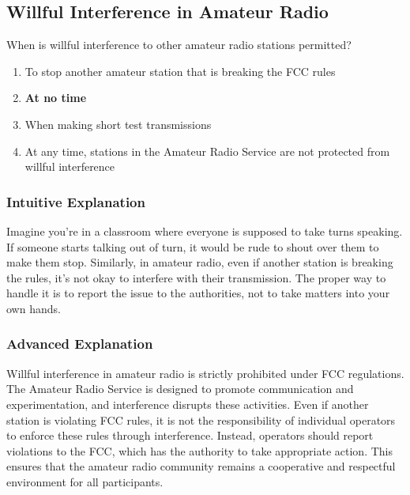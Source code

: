 \subsection{Willful Interference in Amateur Radio}
\label{T1A11}

\begin{tcolorbox}[colback=gray!10!white,colframe=black!75!black,title=T1A11]
When is willful interference to other amateur radio stations permitted?
\begin{enumerate}[label=\Alph*),noitemsep]
    \item To stop another amateur station that is breaking the FCC rules
    \item \textbf{At no time}
    \item When making short test transmissions
    \item At any time, stations in the Amateur Radio Service are not protected from willful interference
\end{enumerate}
\end{tcolorbox}

\subsubsection*{Intuitive Explanation}
Imagine you're in a classroom where everyone is supposed to take turns speaking. If someone starts talking out of turn, it would be rude to shout over them to make them stop. Similarly, in amateur radio, even if another station is breaking the rules, it's not okay to interfere with their transmission. The proper way to handle it is to report the issue to the authorities, not to take matters into your own hands.

\subsubsection*{Advanced Explanation}
Willful interference in amateur radio is strictly prohibited under FCC regulations. The Amateur Radio Service is designed to promote communication and experimentation, and interference disrupts these activities. Even if another station is violating FCC rules, it is not the responsibility of individual operators to enforce these rules through interference. Instead, operators should report violations to the FCC, which has the authority to take appropriate action. This ensures that the amateur radio community remains a cooperative and respectful environment for all participants.